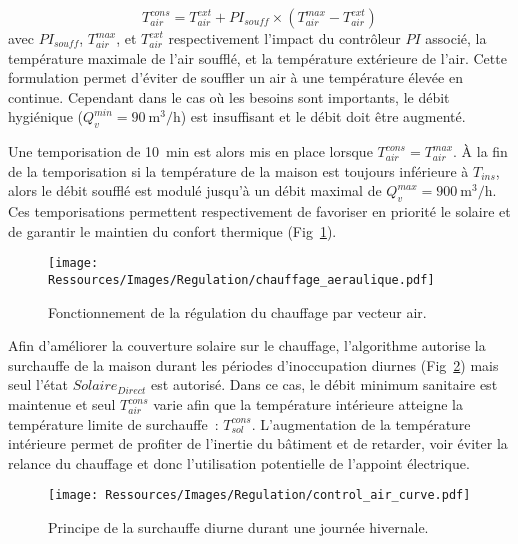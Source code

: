 \begin{equation}\label{eq:temp_soufflage}
    T_{air}^{cons} = T_{air}^{ext} + PI_{souff} \times (T_{air}^{max} - T_{air}^{ext})
\end{equation}
avec $PI_{souff}$, $T_{air}^{max}$, et $T_{air}^{ext}$ respectivement l’impact du
contrôleur $PI$ associé, la température maximale de l’air soufflé, et la température
extérieure de l’air. Cette formulation permet d’éviter de souffler un air à une
température élevée en continue. Cependant dans le cas où les besoins sont importants, le
débit hygiénique ($Q_{v}^{min} = \SI[per-mode=symbol]{90}{\meter\cubed\per\hour}$) est insuffisant
et le débit doit être augmenté.

Une temporisation de \SI{10}{min} est alors mis en place lorsque $T_{air}^{cons} = T_{air}^{max}$.
À la fin de la temporisation si la température de la maison est
toujours inférieure à $T_{ins}$, alors le débit soufflé est modulé jusqu’à un débit maximal de
$Q_{v}^{max} = \SI[per-mode=symbol]{900}{\meter\cubed\per\hour}$. Ces
temporisations permettent respectivement de favoriser en priorité le solaire et de
garantir le maintien du confort thermique (Fig~\ref{fig:chauffage_aeraulique}).

\begin{figure}
    \begin{center}
        \texttt{[image: Ressources/Images/Regulation/chauffage\_aeraulique.pdf]}
    \end{center}
    \caption{Fonctionnement de la régulation du chauffage par vecteur air.
             \label{fig:chauffage_aeraulique}}
\end{figure}

Afin d’améliorer la couverture solaire sur le chauffage, l’algorithme autorise la
surchauffe de la maison durant les périodes d’inoccupation diurnes
(Fig~\ref{fig:control_air}) mais seul l’état $Solaire_{Direct}$ est autorisé. Dans ce
cas, le débit minimum sanitaire est maintenue et seul $T_{air}^{cons}$ varie afin que la
température intérieure atteigne la température limite de surchauffe~: $T^{cons}_{sol}$.
L’augmentation de la température intérieure permet de profiter de l’inertie du bâtiment et
de retarder, voir éviter la relance du chauffage et donc l’utilisation potentielle de
l’appoint électrique.
\begin{figure}
    \begin{center}
        \texttt{[image: Ressources/Images/Regulation/control\_air\_curve.pdf]}
    \end{center}
    \caption{Principe de la surchauffe diurne durant une journée hivernale.
             \label{fig:control_air}}
\end{figure}








